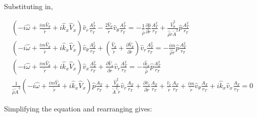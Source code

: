 Substituting in,

\begin{small}
\begin{eqnarray}
\left(
-i \widehat{\omega} 
+ \frac{i m \widehat{V}_{\theta}}{\widetilde{r}}
+i \widehat{k}_x \widehat{V}_x 
\right) 
\widehat{v}_r 
\frac{A_T^2}{r_T}
-\frac{2 \widehat{V}_{\theta}}{\widetilde{r}} \widehat{v}_{\theta}
\frac{A_T^2}{r_T}
 = 
-\frac{1}{\widehat{\overline{\rho}}} \frac{\partial \widehat{p}}{\partial \widetilde{r}}
\frac{A_T^2}{r_T}
+\frac{\widehat{V}_{\theta}^2}{\widehat{\overline{\rho}} \widetilde{r} \widetilde{A}^2} 
\widehat{p}
\frac{A_T^2}{r_T}
\nonumber
\\
\left(
-i \widehat{\omega} 
+ \frac{i m \widehat{V}_{\theta}}{\widetilde{r}}
+i \widehat{k}_x \widehat{V}_x 
\right) 
\widehat{v}_{\theta} 
\frac{A_T^2}{r_T}
+
\left(
\frac{\widehat{V}_{\theta}}{\widetilde{r}}
+\frac{\partial \widehat{V}_{\theta}}{\partial \widetilde{r}}
\right) \widehat{v}_r
\frac{A_T^2}{r_T}
 = 
-\frac{i m}{\widehat{\overline{\rho}} \widetilde{r}} \widehat{p}
\frac{A_T^2}{r_T}
\nonumber
\\
\left(
-i \widehat{\omega}
+ \frac{i m \widehat{V}_{\theta}}{\widetilde{r}}
+i \widehat{k}_x \widehat{V}_x 
\right) 
\widehat{v}_{x} 
\frac{A_T^2}{r_T}
+\frac{\partial \widehat{V}_x}{\partial \widetilde{r}} \widehat{v}_r
\frac{A_T^2}{r_T}
 = 
-\frac{i \widehat{k}_x}{\widehat{\overline{\rho}}} \widehat{p}
\frac{A_T^2}{r_T}
\nonumber
\\
\frac{1}{ \widehat{\overline{\rho}} \widetilde{A}^2}
\left(
-i \widehat{\omega}
+ \frac{i m \widehat{V}_{\theta}}{\widetilde{r}}
+i \widehat{k}_x \widehat{V}_x 
\right) 
\widehat{p} 
\frac{A_T}{r_T}
+\frac{\widehat{V}_{\theta}^2}{\widetilde{A}^2 \widetilde{r}}
\widehat{v}_r
\frac{A_T}{r_T}
+ 
\frac{\partial \widehat{v}_r}{\partial \widetilde{r}}
\frac{A_T}{r_T}
+ 
\frac{\widehat{v}_r}{\widetilde{r}} 
\frac{A_T}{r_T}
+\frac{i m }{\widetilde{r}} \widehat{v}_{\theta} 
\frac{A_T}{r_T}
+ i \widehat{k}_x \widehat{v}_x
\frac{A_T}{r_T}
 = 
0
\nonumber
\end{eqnarray}
\end{small}%

Simplifying the equation and rearranging gives:

